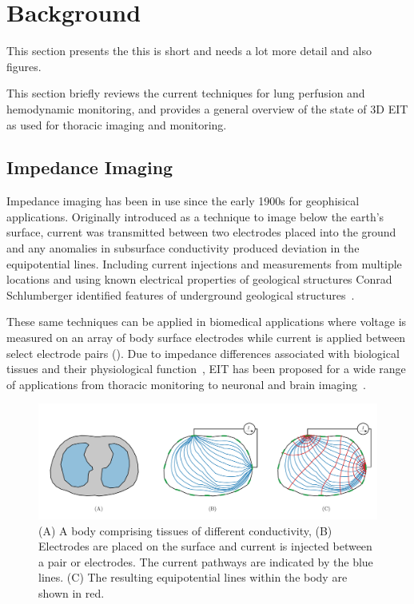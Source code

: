 \chapter{Background}
This section presents the 
this is short and needs a lot more detail and also figures.

This section briefly reviews the current techniques for lung perfusion and hemodynamic
monitoring, and provides a general overview 
of the state of 3D EIT as used for thoracic imaging and monitoring.


\section{Impedance Imaging}
\label{sec:impedance_imaging}
Impedance imaging has been in use since the early 1900s for geophisical applications.  
Originally introduced as a technique to image below the earth’s surface, 
current was transmitted between two electrodes placed into the ground and any 
anomalies in subsurface conductivity produced deviation 
in the equipotential lines. 
Including current injections and measurements from multiple locations and using known 
electrical properties of geological structures Conrad Schlumberger identified
features of underground geological structures~\parencite{allaud_schlumberger_1977}.

These same techniques can be applied in biomedical applications where
voltage is measured on an array of body surface electrodes 
while current is applied between select electrode pairs (). 
Due to impedance differences associated with biological tissues and their physiological 
function~\parencite{geddes_specific_1967,mcadams_tissue_1995},
EIT has been proposed for a wide range of applications from thoracic monitoring
\parencite{frerichs_chest_2017} to neuronal and 
brain imaging~\parencite{holder_electrical_1992}.

\begin{figure}
    \centering
   \includegraphics[width=\textwidth]{chapter2-background/imgs/current_and_equipotential_lines.pdf}
   \caption[Current and Equipotential lines]{\label{fig:cur_equip_line} 
   (A) A body comprising tissues of different conductivity, (B) Electrodes are placed on the surface 
   and current is injected between a pair or electrodes. The current pathways are indicated 
   by the blue lines. (C) The resulting equipotential lines within the body are shown in red.}
\end{figure}


